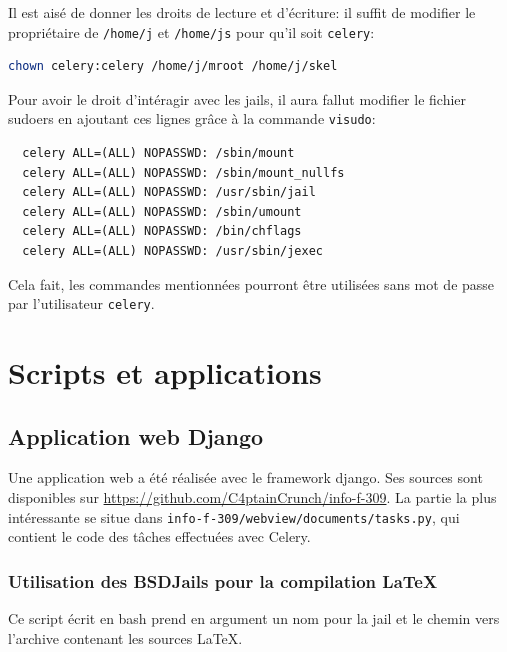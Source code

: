 \documentclass[10pt,a4paper]{article}
\begin{document}
Il est aisé de donner les droits de lecture et d'écriture: il suffit de modifier le propriétaire de \texttt{/home/j} et \texttt{/home/js} pour qu'il soit \texttt{celery}:
\begin{lstlisting}[language=bash]
  chown celery:celery /home/j/mroot /home/j/skel
\end{lstlisting}

Pour avoir le droit d'intéragir avec les jails, il aura fallut modifier le fichier sudoers
en ajoutant ces lignes grâce à la commande \texttt{visudo}:
\begin{lstlisting}
  celery ALL=(ALL) NOPASSWD: /sbin/mount
  celery ALL=(ALL) NOPASSWD: /sbin/mount_nullfs
  celery ALL=(ALL) NOPASSWD: /usr/sbin/jail
  celery ALL=(ALL) NOPASSWD: /sbin/umount
  celery ALL=(ALL) NOPASSWD: /bin/chflags
  celery ALL=(ALL) NOPASSWD: /usr/sbin/jexec
\end{lstlisting}
Cela fait, les commandes mentionnées pourront être utilisées sans mot de passe par l'utilisateur \texttt{celery}.

\section{Scripts et applications}
\label{sec:Scripts et applications}

\subsection{Application web Django}
Une application web a été réalisée avec le framework django. Ses sources sont disponibles sur \url{https://github.com/C4ptainCrunch/info-f-309}. La partie la plus intéressante se situe dans \texttt{info-f-309/webview/documents/tasks.py}, qui contient le code des tâches effectuées avec Celery.


\subsubsection{Utilisation des BSDJails pour la compilation \LaTeX}
Ce script écrit en bash prend en argument un nom pour la jail et le chemin vers l'archive contenant les sources \LaTeX.

\end{document}
